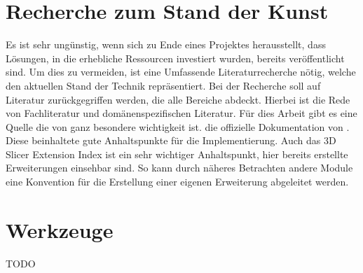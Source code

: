 \section{Recherche zum Stand der Kunst}
Es ist sehr ungünstig, wenn sich zu Ende eines Projektes herausstellt, dass
Lösungen, in die erhebliche Ressourcen investiert wurden, bereits veröffentlicht
sind. Um dies zu vermeiden, ist eine Umfassende Literaturrecherche nötig, welche
den aktuellen Stand der Technik repräsentiert. Bei der Recherche soll auf
Literatur zurückgegriffen werden, die alle Bereiche abdeckt. Hierbei ist die
Rede von Fachliteratur und domänenspezifischen Literatur. Für dies Arbeit gibt es
eine Quelle die von ganz besondere wichtigkeit ist. die offizielle Dokumentation
von \citet{slicer2024}. Diese beinhaltete gute Anhaltspunkte für die
Implementierung. Auch das 3D Slicer Extension Index ist ein sehr wichtiger Anhaltspunkt,
hier bereits erstellte Erweiterungen einsehbar sind. So kann durch näheres Betrachten
andere Module eine Konvention für die Erstellung einer eigenen Erweiterung abgeleitet
werden.

\section{Werkzeuge}
TODO